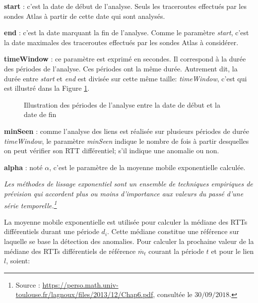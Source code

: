 \textbf{start} : c'est la date de début de l'analyse. Seuls les traceroutes effectués par les sondes Atlas à partir de cette date qui sont analysés.

\textbf{end} : c'est la date marquant la fin de l'analyse. Comme le paramètre \textit{start}, c'est la date maximales des  traceroutes effectués par les sondes Atlas à considérer.

\textbf{timeWindow} :  ce paramètre est exprimé en secondes. Il correspond à la durée des périodes de l'analyse. Ces périodes ont la même durée. Autrement dit, la durée entre   \textit{start} et \textit{end} est divisée sur
 cette même taille: \textit{timeWindow}, c'est qui est illustré dans la Figure  \ref{fig:timing_tex}.




\begin{figure}[h]
	\centering
	\captionsetup{justification=centering}
	
	\caption{Illustration des périodes de l'analyse entre la date de début et la date de fin}
	\label{fig:timing_tex}
\end{figure}
%		 

\textbf{minSeen} : comme l'analyse des liens est réalisée sur plusieurs périodes de durée \textit{timeWindow}, le paramètre \textit{minSeen} indique le nombre de fois à partir desquelles on peut  vérifier son RTT différentiel; s'il indique une anomalie ou non. 

\textbf{alpha }: noté $\alpha$, c'est le paramètre de la  moyenne mobile exponentielle calculée.

\guillemotleft \textit{ Les méthodes de lissage exponentiel  sont un ensemble de techniques empiriques de prévision qui accordent plus ou moins d'importance aux valeurs du passé d'une série temporelle.\footnote{Source : \url{https://perso.math.univ-toulouse.fr/lagnoux/files/2013/12/Chap6.pdf}, consultée le $30/09/2018.$}} \guillemotright

 La  moyenne mobile exponentielle est utilisée pour calculer la médiane des RTTs différentiels durant une période $d_i$. Cette médiane constitue une référence  sur laquelle se base la détection des anomalies.
Pour calculer la prochaine  valeur de la médiane des RTTs différentiels de référence $ \overline{m}_{t}$   courant la période $ t $ et pour le lien $l$, soient: 

